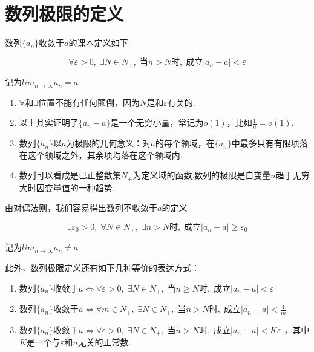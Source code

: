 \documentclass[lang=cn,12pt]{elegantbook}
\begin{document}
\section{数列极限的定义}
数列$\{a_n\}$收敛于$a$的课本定义如下
\begin{definition}
   \[ \forall \varepsilon>0,\;\exists N\in N_+ ,\; \text{当}n>N \text{时}, \;\text{成立}|a_n-a| < \varepsilon\]
   \begin{center}
       记为$lim_{n \to \infty} a_n = a$
   \end{center}
\end{definition}
\begin{remark}
    \begin{enumerate}
    \item $\forall \text{和} \exists $位置不能有任何颠倒，因为$N$是和$\varepsilon$有关的.    \item 以上其实证明了$\{a_n-a\}$是一个无穷小量，常记为$o(1)$，比如$\frac{1}{n}=o(1)$.    \item 数列$\{a_n\}$以$a$为极限的几何意义：对$a$的每个领域，在$\{a_n\}$中最多只有有限项落在这个领域之外，其余项均落在这个领域内.
    \item 数列可以看成是已正整数集$N_+$为定义域的函数.数列的极限是自变量$n$趋于无穷大时因变量值的一种趋势.
    \end{enumerate}
\end{remark}
由对偶法则，我们容易得出数列不收敛于$a$的定义
\begin{definition}
   \[ \exists \varepsilon_0>0,\;\forall N\in N_+ ,\; \exists n>N \text{时}, \;\text{成立}|a_n-a| \geq \varepsilon_0\]
   \begin{center}
       记为$lim_{n \to \infty} a_n \neq a$
   \end{center}
\end{definition}
\begin{note}
    此外，数列极限定义还有如下几种等价的表达方式：
\begin{enumerate}
    \item 数列$\{a_n\}$收敛于$a$$\Longleftrightarrow \forall \varepsilon>0,\;\exists N\in N_+ ,\; \text{当}n\geq N \text{时}, \;\text{成立}|a_n-a| < \varepsilon$
    \item 数列$\{a_n\}$收敛于$a$$\Longleftrightarrow \forall m \in N_+,\;\exists N\in N_+ ,\; \text{当}n> N \text{时}, \;\text{成立}|a_n-a| < \frac{1}{m}$
    \item 数列$\{a_n\}$收敛于$a$$\Longleftrightarrow \forall \varepsilon>0,\;\exists N\in N_+ ,\; \text{当}n> N \text{时}, \;\text{成立}|a_n-a| < K\varepsilon$ ，其中$K$是一个与$\varepsilon$和$n$无关的正常数.
\end{enumerate}
\end{note}
\end{document}
